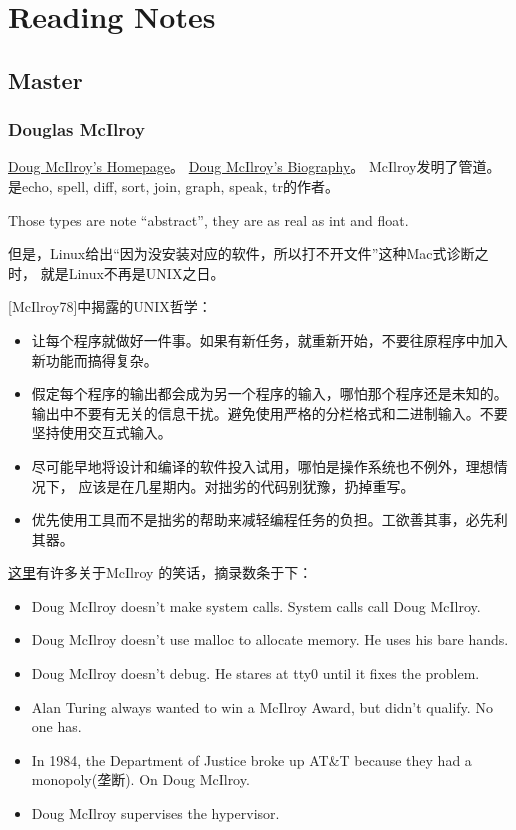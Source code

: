 \chapter{Reading Notes}
\section{Master}

\subsection{Douglas McIlroy}
\href{http://www.cs.dartmouth.edu/~doug/}{Doug McIlroy's Homepage}。
\href{http://www.cs.dartmouth.edu/~doug/biography}{Doug McIlroy's Biography}。
McIlroy发明了管道。是echo, spell, diff, sort, join, graph, speak, tr的作者。

Those types are note ``abstract'', they are as real as int and float.

但是，Linux给出``因为没安装对应的软件，所以打不开文件''这种Mac式诊断之时，
就是Linux不再是UNIX之日。

[McIlroy78]中揭露的UNIX哲学：
\begin{itemize}
\item 让每个程序就做好一件事。如果有新任务，就重新开始，不要往原程序中加入新功能而搞得复杂。
\item 假定每个程序的输出都会成为另一个程序的输入，哪怕那个程序还是未知的。
输出中不要有无关的信息干扰。避免使用严格的分栏格式和二进制输入。不要坚持使用交互式输入。
\item 尽可能早地将设计和编译的软件投入试用，哪怕是操作系统也不例外，理想情况下，
应该是在几星期内。对拙劣的代码别犹豫，扔掉重写。
\item 优先使用工具而不是拙劣的帮助来减轻编程任务的负担。工欲善其事，必先利其器。
\end{itemize}

\href{http://www.cs.dartmouth.edu/~sinclair/doug/?doug=mcilroy}{这里}有许多关于McIlroy
的笑话，摘录数条于下：
\begin{itemize}
\item Doug McIlroy doesn't make system calls. System calls call Doug McIlroy.
\item Doug McIlroy doesn't use malloc to allocate memory. He uses his bare hands.
\item Doug McIlroy doesn't debug. He stares at tty0 until it fixes the problem.
\item Alan Turing always wanted to win a McIlroy Award, but didn't qualify. No one has.
\item In 1984, the Department of Justice broke up AT\&T because they had a monopoly(垄断). On Doug McIlroy.
\item Doug McIlroy supervises the hypervisor.
\end{itemize}

